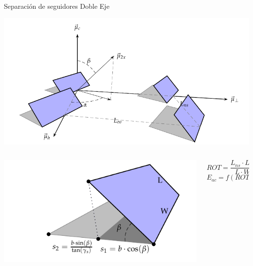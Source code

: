 \documentclass[xcolor={usenames,svgnames,dvipsnames}]{beamer}
\begin{document}
\begin{frame}[label={sec:org44c524d}]{Separación de seguidores Doble Eje}
\begin{center}
\includegraphics[height=0.5\textheight]{../figs/Sombras2X.pdf}
\end{center}

\begin{columns}
\begin{column}{0.6\columnwidth}
\begin{center}
\includegraphics[width=.9\linewidth]{../figs/DimensionesSeguidorSombra.pdf}
\end{center}
\end{column}

\begin{column}{0.4\columnwidth}
$$ROT=\frac{L_{ns}\cdot L_{eo}}{L \cdot W}$$
$$E_{ac}=f(ROT)??$$
\end{column}
\end{columns}
\end{frame}
\end{document}
